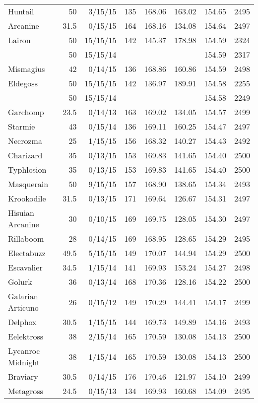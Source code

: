 \begin{longtable}{lrrrrrrr}
Huntail & 50 & 3/15/15 & 135 & 168.06 & 163.02 & 154.65 & 2495\\
Arcanine & 31.5 & 0/15/15 & 164 & 168.16 & 134.08 & 154.64 & 2497\\
Lairon & 50 & 15/15/15 & 142 & 145.37 & 178.98 & 154.59 & 2324\\
 & 50 & 15/15/14 & & & & 154.59 & 2317\\
Mismagius & 42 & 0/14/15 & 136 & 168.86 & 160.86 & 154.59 & 2498\\
Eldegoss & 50 & 15/15/15 & 142 & 136.97 & 189.91 & 154.58 & 2255\\
 & 50 & 15/15/14 & & & & 154.58 & 2249\\
Garchomp & 23.5 & 0/14/13 & 163 & 169.02 & 134.05 & 154.57 & 2499\\
Starmie & 43 & 0/15/14 & 136 & 169.11 & 160.25 & 154.47 & 2497\\
Necrozma & 25 & 1/15/15 & 156 & 168.32 & 140.27 & 154.43 & 2492\\
Charizard & 35 & 0/13/15 & 153 & 169.83 & 141.65 & 154.40 & 2500\\
Typhlosion & 35 & 0/13/15 & 153 & 169.83 & 141.65 & 154.40 & 2500\\
Masquerain & 50 & 9/15/15 & 157 & 168.90 & 138.65 & 154.34 & 2493\\
Krookodile & 31.5 & 0/13/15 & 171 & 169.64 & 126.67 & 154.31 & 2497\\
Hisuian Arcanine & 30 & 0/10/15 & 169 & 169.75 & 128.05 & 154.30 & 2497\\
Rillaboom & 28 & 0/14/15 & 169 & 168.95 & 128.65 & 154.29 & 2495\\
Electabuzz & 49.5 & 5/15/15 & 149 & 170.07 & 144.94 & 154.29 & 2500\\
Escavalier & 34.5 & 1/15/14 & 141 & 169.93 & 153.24 & 154.27 & 2498\\
Golurk & 36 & 0/13/14 & 168 & 170.36 & 128.16 & 154.22 & 2500\\
Galarian Articuno & 26 & 0/15/12 & 149 & 170.29 & 144.41 & 154.17 & 2499\\
Delphox & 30.5 & 1/15/15 & 144 & 169.73 & 149.89 & 154.16 & 2493\\
Eelektross & 38 & 2/15/14 & 165 & 170.59 & 130.08 & 154.13 & 2500\\
Lycanroc Midnight & 38 & 1/15/14 & 165 & 170.59 & 130.08 & 154.13 & 2500\\
Braviary & 30.5 & 0/14/15 & 176 & 170.46 & 121.97 & 154.10 & 2499\\
Metagross & 24.5 & 0/15/13 & 134 & 169.93 & 160.68 & 154.09 & 2495\\

\end{longtable}
